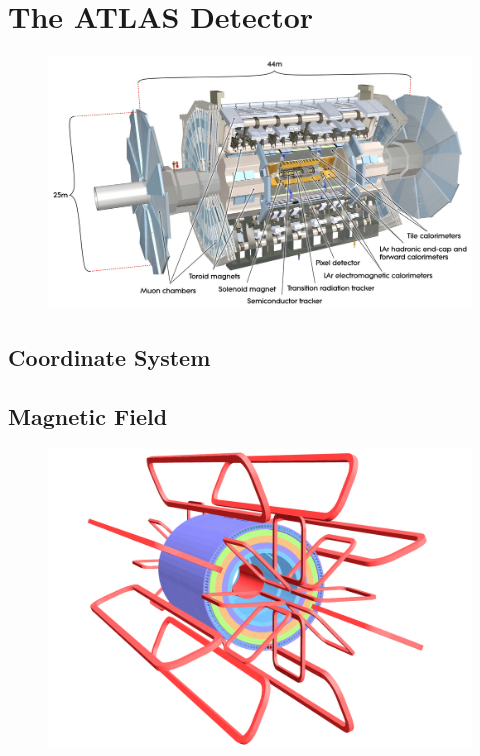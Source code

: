 \chapter{The ATLAS Detector}

\label{ch:atlas}

\begin{figure}[hbtp]
\includegraphics[width=\fullfig]{figures/atlas_overview.pdf}
\caption{}
\label{fig:atlas_overview}
\end{figure}


\section{Coordinate System}


\section{Magnetic Field}

\begin{figure}[hbtp]
\includegraphics[width=\fullfig]{figures/magnets_overview.pdf}
\caption{}
\label{fig:magnets_overview}
\end{figure}


